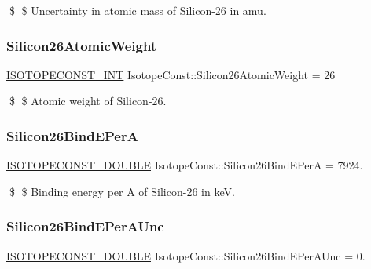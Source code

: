 \$ \$ Uncertainty in atomic mass of Silicon-\/26 in amu. \mbox{\label{group___isotope_const-_silicon-_si26_gafc5112fcc52c598211a52c0da7d2db6c}} 
\subsubsection{\texorpdfstring{Silicon26\+Atomic\+Weight}{Silicon26AtomicWeight}}
{\footnotesize\ttfamily \mbox{\hyperlink{group___isotope_const-_macros_ga5f18360b3e99483a35c32d789e62621c}{I\+S\+O\+T\+O\+P\+E\+C\+O\+N\+S\+T\+\_\+\+I\+NT}} Isotope\+Const\+::\+Silicon26\+Atomic\+Weight = 26}

\$ \$ Atomic weight of Silicon-\/26. \mbox{\label{group___isotope_const-_silicon-_si26_ga50e8b190aa4b4eac4a82fd0ed543f824}} 
\subsubsection{\texorpdfstring{Silicon26\+Bind\+E\+PerA}{Silicon26BindEPerA}}
{\footnotesize\ttfamily \mbox{\hyperlink{group___isotope_const-_macros_ga8f45a7272ce02c0b4c65c44636ed719a}{I\+S\+O\+T\+O\+P\+E\+C\+O\+N\+S\+T\+\_\+\+D\+O\+U\+B\+LE}} Isotope\+Const\+::\+Silicon26\+Bind\+E\+PerA = 7924.}

\$ \$ Binding energy per A of Silicon-\/26 in keV. \mbox{\label{group___isotope_const-_silicon-_si26_ga9c8d5a0df401a4278dcb35f330c16c52}} 
\subsubsection{\texorpdfstring{Silicon26\+Bind\+E\+Per\+A\+Unc}{Silicon26BindEPerAUnc}}
{\footnotesize\ttfamily \mbox{\hyperlink{group___isotope_const-_macros_ga8f45a7272ce02c0b4c65c44636ed719a}{I\+S\+O\+T\+O\+P\+E\+C\+O\+N\+S\+T\+\_\+\+D\+O\+U\+B\+LE}} Isotope\+Const\+::\+Silicon26\+Bind\+E\+Per\+A\+Unc = 0.}

